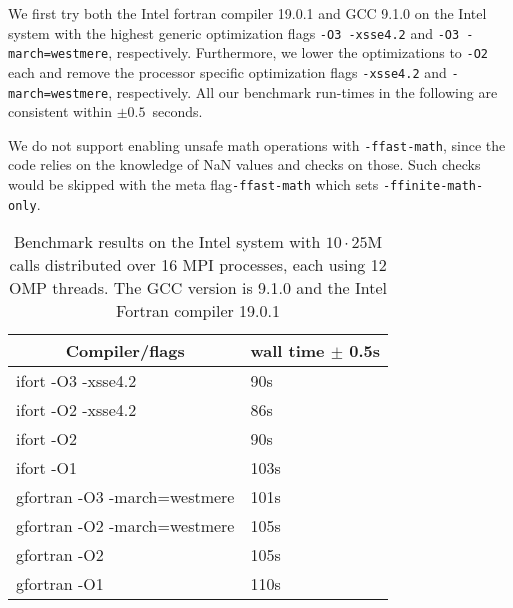 We first try both the Intel fortran compiler 19.0.1 and GCC 9.1.0 on the Intel system with the highest generic
optimization flags \texttt{-O3 -xsse4.2} and \texttt{-O3 -march=westmere}, respectively. Furthermore,
we lower the optimizations to \texttt{-O2} each and remove the processor specific optimization flags
\texttt{-xsse4.2} and \texttt{-march=westmere}, respectively. All our benchmark run-times in the following are 
consistent within $\pm 0.5$~seconds.

We do not support enabling unsafe math operations with \texttt{-ffast-math}, since the code 
relies on the knowledge of NaN values and checks on those. Such checks would be skipped with the meta 
flag\texttt{-ffast-math} which sets \texttt{-ffinite-math-only}.


\begin{table}[]
	\centering
	\caption{Benchmark results on the Intel system with $10\cdot25$M calls distributed over 16 MPI processes, each 
	using 12 
	OMP 
	threads. The GCC version is 9.1.0 and the Intel Fortran compiler 19.0.1}
	\vspace{1em}
	\begin{tabular}{@{}ll@{}}
		\hline
		\multicolumn{1}{c}{\textbf{Compiler/flags}} & \multicolumn{1}{c}{\textbf{wall time $\pm$ 0.5s}} \\ \hline
		ifort -O3 -xsse4.2                          & 90s                                           \\
		ifort -O2 -xsse4.2                          & 86s                                           \\
		ifort -O2									& 90s											\\
		ifort -O1									& 103s 											\\
		gfortran -O3 -march=westmere                & 101s                                          \\ 
		gfortran -O2 -march=westmere		        & 105s											\\
		gfortran -O2								& 105s											\\
		gfortran -O1								& 110s											\\
		\hline
	\end{tabular}
	\label{tab:benchintel}
\end{table}


